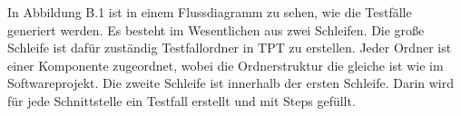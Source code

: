 In Abbildung B.1 ist in einem Flussdiagramm zu sehen, wie die Testfälle generiert werden.
Es besteht im Wesentlichen aus zwei Schleifen. Die große Schleife ist dafür zuständig Testfallordner in TPT zu
erstellen. Jeder Ordner ist einer Komponente zugeordnet, wobei die Ordnerstruktur die gleiche ist wie im Softwareprojekt.
Die zweite Schleife ist innerhalb der ersten Schleife. Darin wird für jede Schnittstelle ein Testfall erstellt und mit
Steps gefüllt.


% 






